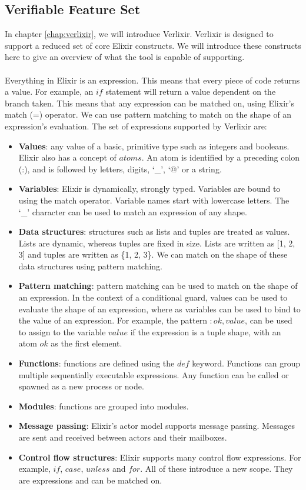\subsection{Verifiable Feature Set} \label{sec:verifiable_feature_set}
In chapter \ref{chap:verlixir}, we will introduce Verlixir. Verlixir is designed to support a reduced set of core Elixir constructs. We will introduce these constructs here to give an overview of what the tool is capable of supporting.
\\ \\
Everything in Elixir is an expression. This means that every piece of code returns a value. For example, an $if$ statement will return a value dependent on the branch taken. This means that any expression can be matched on, using Elixir's match (=) operator. We can use pattern matching to match on the shape of an expression's evaluation. The set of expressions supported by Verlixir are:
\begin{itemize}
    \item \textbf{Values}: any value of a basic, primitive type such as integers and booleans. Elixir also has a concept of $atoms$. An atom is identified by a preceding colon (:), and is followed by letters, digits, `\_', `@' or a string.
    \item \textbf{Variables}: Elixir is dynamically, strongly typed. Variables are bound to using the match operator. Variable names start with lowercase letters. The `\_' character can be used to match an expression of any shape.
    \item \textbf{Data structures}: structures such as lists and tuples are treated as values. Lists are dynamic, whereas tuples are fixed in size. Lists are written as [1, 2, 3] and tuples are written as \{1, 2, 3\}. We can match on the shape of these data structures using pattern matching.
    \item \textbf{Pattern matching}: pattern matching can be used to match on the shape of an expression. In the context of a conditional guard, values can be used to evaluate the shape of an expression, where as variables can be used to bind to the value of an expression. For example, the pattern ${:ok, value}$, can be used to assign to the variable $value$ if the expression is a tuple shape, with an atom $ok$ as the first element.
    \item \textbf{Functions}: functions are defined using the $def$ keyword. Functions can group multiple sequentially executable expressions. Any function can be called or spawned as a new process or node.
    \item \textbf{Modules}: functions are grouped into modules.
    \item \textbf{Message passing}: Elixir's actor model supports message passing. Messages are sent and received between actors and their mailboxes.
    \item \textbf{Control flow structures}: Elixir supports many control flow expressions. For example, $if$, $case$, $unless$ and $for$. All of these introduce a new scope. They are expressions and can be matched on.
\end{itemize}
